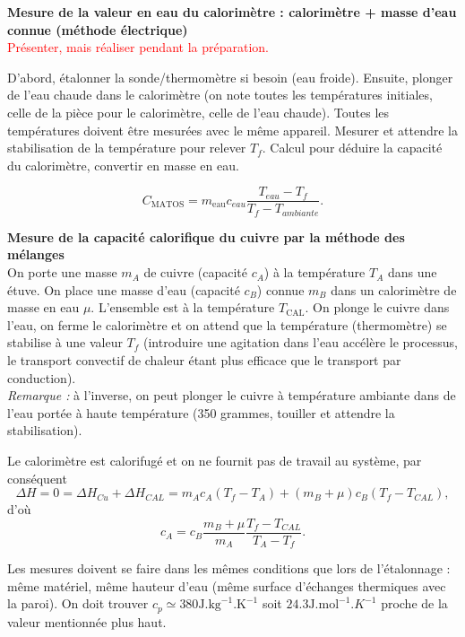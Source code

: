 \documentclass[11pt,a4paper]{report}
\begin{document}
\textbf{Mesure de la valeur en eau du calorimètre : calorimètre + masse d'eau connue (méthode électrique)}\\

\textcolor{red}{Présenter, mais réaliser pendant la préparation.}

D'abord, étalonner la sonde/thermomètre si besoin (eau froide). Ensuite, plonger de l'eau chaude dans le calorimètre (on note toutes les températures initiales, celle de la pièce pour le calorimètre, celle de l'eau chaude). Toutes les températures doivent être mesurées avec le même appareil. Mesurer et attendre la stabilisation de la température pour relever $T_f$. Calcul pour déduire la capacité du calorimètre, convertir en masse en eau.

\begin{equation}
	C_\text{MATOS} = m_\text{eau} c_{eau} \frac{T_{eau} - T_f}{T_f - T_{ambiante}}.
\end{equation}

\textbf{Mesure de la capacité calorifique du cuivre par la méthode des mélanges}\\

On porte une masse $m_A$ de cuivre (capacité $c_A$) à la température $T_A$ dans une étuve.
On place une masse d'eau (capacité $c_B$) connue $m_B$ dans un calorimètre de masse en eau $\mu$. L'ensemble est à la température $T_\text{CAL}$.
On plonge le cuivre dans l'eau, on ferme le calorimètre et on attend que la température (thermomètre) se stabilise à une valeur $T_f$ (introduire une agitation dans l'eau accélère le processus, le transport convectif de chaleur étant plus efficace que le transport par conduction).\\

\textit{Remarque :} à l'inverse, on peut plonger le cuivre à température ambiante dans de l'eau portée à haute température (350 grammes, touiller et attendre la stabilisation).

Le calorimètre est calorifugé et on ne fournit pas de travail au système, par conséquent
\begin{equation}
	\Delta H = 0 = \Delta H_{Cu} + \Delta H_{CAL} = m_A c_A (T_f - T_A) + (m_B + \mu)c_B(T_f - T_{CAL}),
\end{equation}
d'où
\begin{equation}
	c_A = c_B \frac{m_B + \mu}{m_A}\frac{T_f - T_{CAL}}{T_A - T_f}.
\end{equation}

Les mesures doivent se faire dans les mêmes conditions que lors de l'étalonnage : même matériel, même hauteur d'eau (même surface d'échanges thermiques avec la paroi).
On doit trouver $c_p \simeq 380 \text{J.kg}^{-1}.\text{K}^{-1}$ soit $24.3 \text{J.mol}^{-1}{.K}^{-1}$ proche de la valeur mentionnée plus haut.
\end{document}
